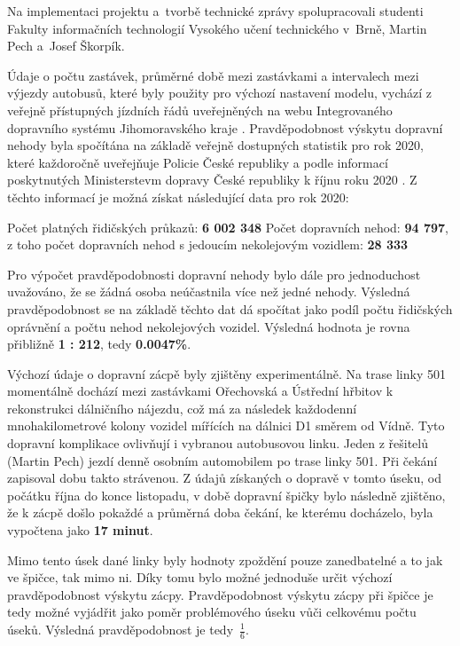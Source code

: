 \documentclass[a4paper]{article}
\begin{document}
            Na implementaci projektu a~tvorbě technické zprávy spolupracovali studenti Fakulty informačních technologií Vysokého učení technického v~Brně, Martin Pech a~Josef Škorpík.
            
            Údaje o počtu zastávek, průměrné době mezi zastávkami a intervalech mezi výjezdy autobusů, které byly použity pro výchozí nastavení modelu, vychází z veřejně přístupných jízdních řádů uveřejněných na webu Integrovaného dopravního systému Jihomoravského kraje \cite{Jizdni_rad}. 
            Pravděpodobnost výskytu dopravní nehody byla spočítána na základě veřejně dostupných statistik pro rok 2020, které každoročně uveřejňuje Policie České republiky \cite{Accident_statistics} a podle informací poskytnutých Ministerstevm dopravy České republiky k říjnu roku 2020 \cite{Pocet_ridicaku}. Z těchto informací je možná získat následující data pro rok 2020:
            \begin{outline}
            	\1 Počet platných řidičských průkazů: \textbf{6 002 348}
            	\1 Počet dopravních nehod: \textbf{94 797}, z toho počet dopravních nehod s jedoucím nekolejovým vozidlem: \textbf{28 333}
            \end{outline}
            
            Pro výpočet pravděpodobnosti dopravní nehody bylo dále pro jednoduchost uvažováno, že se žádná osoba neúčastnila více než jedné nehody. Výsledná pravděpodobnost se na základě těchto dat dá spočítat jako podíl počtu řidičských oprávnění a počtu nehod nekolejových vozidel. Výsledná hodnota je rovna přibližně \textbf{1 : 212}, tedy \textbf{0.0047\%}.
            
            Výchozí údaje o dopravní zácpě byly zjištěny experimentálně. Na trase linky 501 momentálně dochází mezi zastávkami Ořechovská a Ústřední hřbitov k rekonstrukci dálničního nájezdu, což má za následek každodenní mnohakilometrové kolony vozidel mířících na dálnici D1 směrem od Vídně. Tyto dopravní komplikace ovlivňují i vybranou autobusovou linku. Jeden z řešitelů (Martin Pech) jezdí denně osobním automobilem po trase linky 501. Při čekání zapisoval dobu takto strávenou.
            Z údajů získaných o dopravě v tomto úseku, od počátku října do konce listopadu, v době dopravní špičky bylo následně zjištěno, že k zácpě došlo pokaždé a průměrná doba čekání, ke kterému docházelo, byla vypočtena jako \textbf{17 minut}.
            
            Mimo tento úsek dané linky byly hodnoty zpoždění pouze zanedbatelné a to jak ve špičce, tak mimo ni. Díky tomu bylo možné jednoduše určit výchozí pravděpodobnost výskytu zácpy. Pravděpodobnost výskytu zácpy při špičce je tedy možné vyjádřit jako poměr problémového úseku vůči celkovému počtu úseků. Výsledná pravděpodobnost je tedy~\textbf{$\frac{1}{6}$}. 
            
\end{document}
